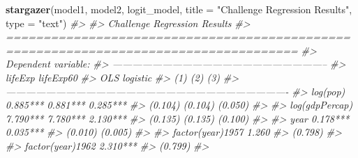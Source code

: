 \documentclass[]{book}
\newenvironment{Shaded}{\begin{snugshade}}{\end{snugshade}}
\newcommand{\KeywordTok}[1]{\textcolor[rgb]{0.13,0.29,0.53}{\textbf{#1}}}
\newcommand{\DataTypeTok}[1]{\textcolor[rgb]{0.13,0.29,0.53}{#1}}
\newcommand{\StringTok}[1]{\textcolor[rgb]{0.31,0.60,0.02}{#1}}
\newcommand{\CommentTok}[1]{\textcolor[rgb]{0.56,0.35,0.01}{\textit{#1}}}
\newcommand{\NormalTok}[1]{#1}
\begin{document}
\begin{Shaded}
\begin{Highlighting}[]
\KeywordTok{stargazer}\NormalTok{(model1, model2, logit_model, }\DataTypeTok{title =} \StringTok{"Challenge Regression Results"}\NormalTok{, }\DataTypeTok{type =} \StringTok{"text"}\NormalTok{)}
\CommentTok{#> }
\CommentTok{#> Challenge Regression Results}
\CommentTok{#> =====================================================================================}
\CommentTok{#>                                            Dependent variable:                       }
\CommentTok{#>                     -----------------------------------------------------------------}
\CommentTok{#>                                            lifeExp                         lifeExp60 }
\CommentTok{#>                                              OLS                            logistic }
\CommentTok{#>                                 (1)                        (2)                (3)    }
\CommentTok{#> -------------------------------------------------------------------------------------}
\CommentTok{#> log(pop)                     0.885***                    0.881***           0.285*** }
\CommentTok{#>                               (0.104)                    (0.104)            (0.050)  }
\CommentTok{#>                                                                                      }
\CommentTok{#> log(gdpPercap)               7.790***                    7.780***           2.130*** }
\CommentTok{#>                               (0.135)                    (0.135)            (0.100)  }
\CommentTok{#>                                                                                      }
\CommentTok{#> year                         0.178***                                       0.035*** }
\CommentTok{#>                               (0.010)                                       (0.005)  }
\CommentTok{#>                                                                                      }
\CommentTok{#> factor(year)1957                                          1.260                      }
\CommentTok{#>                                                          (0.798)                     }
\CommentTok{#>                                                                                      }
\CommentTok{#> factor(year)1962                                         2.310***                    }
\CommentTok{#>                                                          (0.799)                     }
\CommentTok{#>                                                                                      }

\end{Highlighting}
\end{Shaded}
\end{document}
